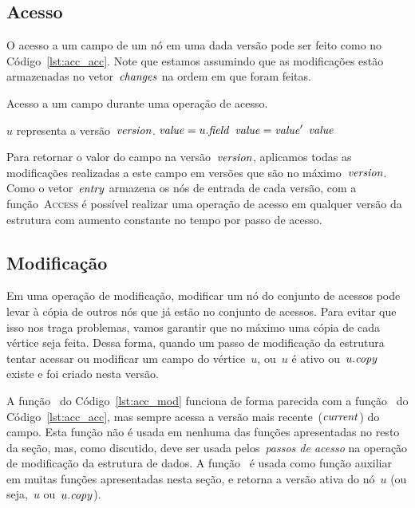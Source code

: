 \documentclass[../../main.tex]{subfiles}
\begin{document}
\subsection{Acesso}

O acesso a um campo de um nó em uma dada versão pode ser feito como no Código~\ref{lst:acc_acc}. Note que estamos assumindo que as modificações estão armazenadas no vetor~$\mathit{changes}$ na ordem em que foram feitas.

\begin{algorithm}
\caption{Acesso a um campo durante uma operação de acesso.} \label{lst:acc_acc}
\begin{algorithmic}[1]

\Require $u$ representa a versão~$\mathit{version}$.
	\State $\mathit{value} = u.\mathit{field}$
			\State $\mathit{value} = \mathit{value}'$
		\EndIf
	\EndFor
	\State \Return $\mathit{value}$
\EndFunction

\end{algorithmic}
\end{algorithm}

Para retornar o valor do campo na versão~$\mathit{version}$, aplicamos todas as modificações realizadas a este campo em versões que são no máximo~$\mathit{version}$. Como o vetor~$\mathit{entry}$ armazena os nós de entrada de cada versão, com a função~\textsc{Access} é possível realizar uma operação de acesso em qualquer versão da estrutura com aumento constante no tempo por passo de acesso.

\subsection{Modificação}

Em uma operação de modificação, modificar um nó do conjunto de acessos pode levar à cópia de outros nós que já estão no conjunto de acessos. Para evitar que isso nos traga problemas, vamos garantir que no máximo uma cópia de cada vértice seja feita. Dessa forma, quando um passo de modificação da estrutura tentar acessar ou modificar um campo do vértice~$u$, ou~$u$ é ativo ou~$u.\mathit{copy}$ existe e foi criado nesta versão.

A função~ do Código~\ref{lst:acc_mod} funciona de forma parecida com a função~ do Código~\ref{lst:acc_acc}, mas sempre acessa a versão mais recente~($\mathit{current}$) do campo. Esta função não é usada em nenhuma das funções apresentadas no resto da seção, mas, como discutido, deve ser usada pelos~\emph{passos de acesso} na operação de modificação da estrutura de dados. A função~ é usada como função auxiliar em muitas funções apresentadas nesta seção, e retorna a versão ativa do nó~$u$ (ou seja,~$u$ ou~$u.\mathit{copy}$).
\end{document}
